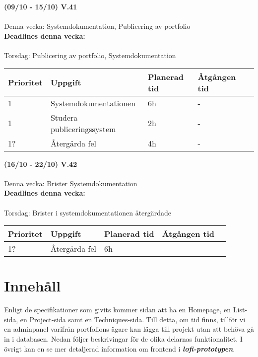 \documentclass{TDP003mall}
\begin{document}
\vspace{3em}

\textbf{(09/10 - 15/10) V.41}\\\\
Denna vecka: Systemdokumentation, Publicering av portfolio\\

\textbf{Deadlines denna vecka: }\\\\
Torsdag: Publicering av portfolio, Systemdokumentation


\begin{table}
\begin{tabular}{|l|l|l|l|l|}
\hline
 Prioritet & Uppgift                    & Planerad tid & Åtgången tid \\ \hline
 1         & Systemdokumentationen  & 6h          & -          \\ \hline
 1         & Studera publiceringssystem & 2h           & -       \\ \hline
 1?        & Återgärda fel              & 4h            & -       \\ \hline
\end{tabular}
\end{table}

\hrulefill

\textbf{(16/10 - 22/10) V.42}\\\\
Denna vecka: Brister Systemdokumentation\\

\textbf{Deadlines denna vecka: }\\\\
Torsdag: Brister i systemdokumentationen återgärdade


\begin{table}[]
\begin{tabular}{|l|l|l|l|l|}
\hline
 Prioritet & Uppgift                    & Planerad tid & Åtgången tid \\ \hline
 1?         & Återgärda fel & 6h          & -          \\ \hline

\end{tabular}
\end{table}

\hrulefill

\section{Innehåll}
Enligt de specifikationer som givits kommer sidan att ha en Homepage, en List-sida, 
en Project-sida samt en Techniques-sida. Till detta, om tid finns, tillför vi en
adminpanel varifrån portfolions ägare kan lägga till projekt utan att behöva gå in i
databasen. Nedan följer beskrivingar för de olika delarnas funktionalitet. I övrigt kan
en se mer detaljerad information om frontend i \textbf{\textit{lofi-prototypen}}.
\end{document}

